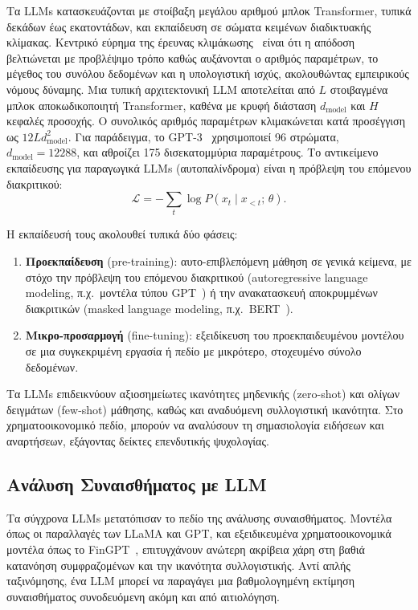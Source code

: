 Τα LLMs κατασκευάζονται με στοίβαξη μεγάλου αριθμού μπλοκ Transformer, τυπικά
δεκάδων έως εκατοντάδων, και εκπαίδευση σε σώματα κειμένων διαδικτυακής
κλίμακας. Κεντρικό εύρημα της έρευνας κλιμάκωσης~\cite{kaplan2020scaling, brown2020gpt3} είναι
ότι η απόδοση βελτιώνεται με προβλέψιμο τρόπο καθώς αυξάνονται ο αριθμός
παραμέτρων, το μέγεθος του συνόλου δεδομένων και η υπολογιστική ισχύς, ακολουθώντας
εμπειρικούς νόμους δύναμης. Μια τυπική αρχιτεκτονική LLM αποτελείται από $L$
στοιβαγμένα μπλοκ αποκωδικοποιητή Transformer, καθένα με κρυφή διάσταση
$d_{\text{model}}$ και $H$ κεφαλές προσοχής. Ο συνολικός αριθμός παραμέτρων
κλιμακώνεται κατά προσέγγιση ως $12 L d_{\text{model}}^2$. Για παράδειγμα, το
GPT-3~\cite{brown2020gpt3} χρησιμοποιεί 96 στρώματα, $d_{\text{model}} = 12288$,
και αθροίζει 175 δισεκατομμύρια παραμέτρους. Το αντικείμενο εκπαίδευσης για
παραγωγικά LLMs (αυτοπαλίνδρομα) είναι η πρόβλεψη του επόμενου διακριτικού:
\begin{equation}
    \mathcal{L} = -\sum_t \log P(x_t \mid x_{<t};\, \theta).
    \label{eq:lm_loss}
\end{equation}

Η εκπαίδευσή τους ακολουθεί τυπικά δύο φάσεις:
\begin{enumerate}
    \item \textbf{Προεκπαίδευση} (pre-training):
    αυτο-επιβλεπόμενη μάθηση σε γενικά κείμενα, με στόχο την πρόβλεψη του
    επόμενου διακριτικού (autoregressive language
    modeling, π.χ.\ μοντέλα τύπου GPT~\cite{brown2020gpt3})
    ή την ανακατασκευή αποκρυμμένων διακριτικών
    (masked language modeling, π.χ.\
    BERT~\cite{devlin2019bert}).
    \item \textbf{Μικρο-προσαρμογή} (fine-tuning):
    εξειδίκευση του προεκπαιδευμένου μοντέλου σε μια συγκεκριμένη εργασία ή
    πεδίο με μικρότερο, στοχευμένο σύνολο δεδομένων.
\end{enumerate}

Τα LLMs επιδεικνύουν αξιοσημείωτες ικανότητες μηδενικής
(zero-shot) και ολίγων δειγμάτων
(few-shot) μάθησης, καθώς και αναδυόμενη
συλλογιστική ικανότητα. Στο χρηματοοικονομικό πεδίο, μπορούν να αναλύσουν τη
σημασιολογία ειδήσεων και αναρτήσεων, εξάγοντας δείκτες επενδυτικής
ψυχολογίας.


\subsection{Ανάλυση Συναισθήματος με LLM}
\label{subsec:llm-sentiment}

Τα σύγχρονα LLMs μετατόπισαν το πεδίο της ανάλυσης συναισθήματος. Μοντέλα όπως
οι παραλλαγές των LLaMA και GPT,
και εξειδικευμένα χρηματοοικονομικά μοντέλα όπως το
FinGPT~\cite{yang2023fingpt}, επιτυγχάνουν ανώτερη
ακρίβεια χάρη στη βαθιά κατανόηση συμφραζομένων και την ικανότητα
συλλογιστικής. Αντί απλής ταξινόμησης, ένα LLM μπορεί να παραγάγει μια
βαθμολογημένη εκτίμηση συναισθήματος συνοδευόμενη ακόμη και από αιτιολόγηση.


